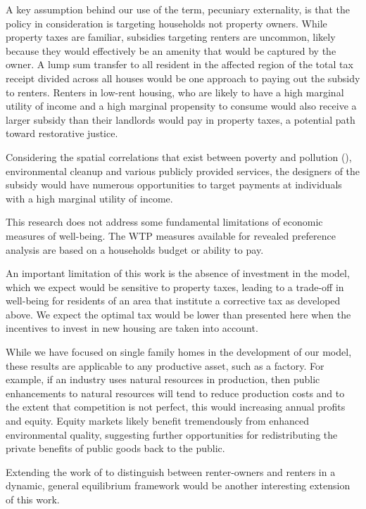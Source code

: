 \documentclass[ecta,nameyear,draft]{econsocart}
\theoremstyle{plain}
\theoremstyle{remark}
\begin{document}
A key assumption behind our use of the term, pecuniary externality, is that the policy in consideration is targeting households not property owners. While property taxes are familiar, subsidies targeting renters are uncommon, likely because they would effectively be an amenity that would be captured by the owner. A lump sum transfer to all resident in the affected region of the total tax receipt divided across all houses would be one approach to paying out the subsidy to renters. Renters in low-rent housing, who are likely to have a high marginal utility of income and a high marginal propensity to consume would also receive a larger subsidy than their landlords would pay in property taxes, a potential path toward restorative justice. 

Considering the spatial correlations that exist between poverty and pollution (\cite{banzhafJustice19}), environmental cleanup and various publicly provided services, the designers of the subsidy would have numerous opportunities to target payments at individuals with a high marginal utility of income.

This research does not address some fundamental limitations of economic measures of well-being. The WTP measures available for revealed preference analysis are based on a households budget or ability to pay. 

An important limitation of this work is the absence of investment in the model, which we expect would be sensitive to property taxes, leading to a trade-off in well-being for residents of an area that institute a corrective tax as developed above. We expect the optimal tax would be lower than presented here when the incentives to invest in new housing are taken into account. 

While we have focused on single family homes in the development of our model, these results are applicable to any productive asset, such as a factory. For example, if an industry uses natural resources in production, then public enhancements to natural resources will tend to reduce production costs and to the extent that competition is not perfect, this would increasing annual profits and equity. Equity markets likely benefit tremendously from enhanced environmental quality, suggesting further opportunities for redistributing the private benefits of public goods back to the public.



Extending the work of \cite{kanemoto88} to distinguish between renter-owners and renters in a dynamic, general equilibrium framework would be another interesting extension of this work.
\end{document}
